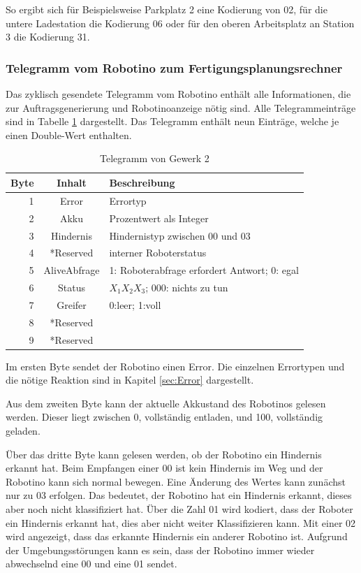 So ergibt sich für Beispielsweise Parkplatz 2 eine Kodierung von 02, für die untere Ladestation die Kodierung 06 oder für den oberen Arbeitsplatz an Station 3 die Kodierung 31.

\subsubsection{Telegramm vom Robotino zum Fertigungsplanungsrechner}

Das zyklisch gesendete Telegramm vom Robotino enthält alle Informationen, die zur Auftragsgenerierung und Robotinoanzeige nötig sind. Alle Telegrammeinträge sind in Tabelle \ref{tab:TelegrammVonG2} dargestellt. Das Telegramm enthält neun Einträge, welche je einen Double-Wert enthalten. 

\begin{table}[!ht]
	\centering
	\begin{tabular}{|r|c|l|}
		\hline
		Byte & Inhalt	&	Beschreibung \\
		\hline
			1  & Error &  Errortyp  \\
			2  & Akku  & Prozentwert als Integer \\
			3  & Hindernis & Hindernistyp zwischen 00 und 03\\
		  4  & *Reserved &  interner Roboterstatus \\
		  5  & AliveAbfrage  & 1: Roboterabfrage erfordert Antwort; 0: egal \\
		  6  & Status & $X_1X_2X_3$; 000: nichts zu tun \\
		  7  & Greifer   & 0:leer; 1:voll \\
		  8  & *Reserved &  \\
		  9  & *Reserved   &  \\
		\hline
	\end{tabular}
	\caption{Telegramm von Gewerk 2}
	\label{tab:TelegrammVonG2}
\end{table}

Im ersten Byte sendet der Robotino einen Error. Die einzelnen Errortypen und die nötige Reaktion sind in Kapitel \ref{sec:Error} dargestellt. 

Aus dem zweiten Byte kann der aktuelle Akkustand des Robotinos gelesen werden. Dieser liegt zwischen 0, vollständig entladen, und 100, vollständig geladen. 

Über das dritte Byte kann gelesen werden, ob der Robotino ein Hindernis erkannt hat. Beim Empfangen einer 00 ist kein Hindernis im Weg und der Robotino kann sich normal bewegen. Eine Änderung des Wertes kann zunächst nur zu 03 erfolgen. Das bedeutet, der Robotino hat ein Hindernis erkannt, dieses aber noch nicht klassifiziert hat. Über die Zahl 01 wird kodiert, dass der Roboter ein Hindernis erkannt hat, dies aber nicht weiter Klassifizieren kann. Mit einer 02 wird angezeigt, dass das erkannte Hindernis ein anderer Robotino ist. Aufgrund der Umgebungsstörungen kann es sein, dass der Robotino immer wieder abwechselnd eine 00 und eine 01 sendet. 

